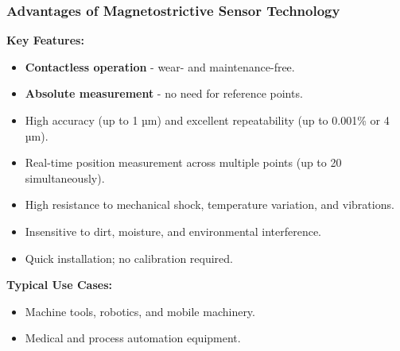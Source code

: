 \begin{frame}
	\frametitle{Advantages of Magnetostrictive Sensor Technology}
    \small
    \textbf{Key Features:}
    \begin{itemize}
        \item \textbf{Contactless operation} - wear- and maintenance-free.
        \item \textbf{Absolute measurement} - no need for reference points.
        \item High accuracy (up to 1 µm) and excellent repeatability (up to 0.001\% or 4 µm).
        \item Real-time position measurement across multiple points (up to 20 simultaneously).
        \item High resistance to mechanical shock, temperature variation, and vibrations.
        \item Insensitive to dirt, moisture, and environmental interference.
        \item Quick installation; no calibration required.
    \end{itemize}
    \medskip
    \textbf{Typical Use Cases:}
    \begin{itemize}
        \item Machine tools, robotics, and mobile machinery.
        \item Medical and process automation equipment.
    \end{itemize}
\end{frame}

